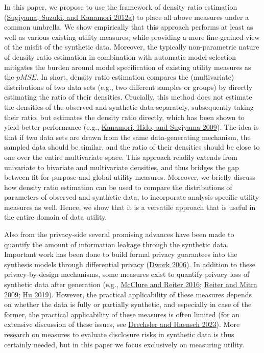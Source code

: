 \documentclass[
]{template/style/uneceart}
\begin{document}
In this paper, we propose to use the framework of density ratio
estimation
(\protect\hyperlink{ref-sugiyama_suzuki_kanamori_2012}{Sugiyama, Suzuki,
and Kanamori 2012a}) to place all above measures under a common
umbrella. We show empirically that this approach performs at least as
well as various existing utility measures, while providing a more
fine-grained view of the misfit of the synthetic data. Moreover, the
typically non-parametric nature of density ratio estimation in
combination with automatic model selection mitigates the burden around
model specification of existing utility measures as the \(pMSE\). In
short, density ratio estimation compares the (multivariate)
distributions of two data sets (e.g., two different samples or groups)
by directly estimating the ratio of their densities. Crucially, this
method does not estimate the densities of the observed and synthetic
data separately, subsequently taking their ratio, but estimates the
density ratio directly, which has been shown to yield better performance
(e.g., \protect\hyperlink{ref-kanamori_ulsif_2009}{Kanamori, Hido, and
Sugiyama 2009}). The idea is that if two data sets are drawn from the
same data-generating mechanism, the sampled data should be similar, and
the ratio of their densities should be close to one over the entire
multivariate space. This approach readily extends from univariate to
bivariate and multivariate densities, and thus bridges the gap between
fit-for-purpose and global utility measures. Moreover, we briefly
discuss how density ratio estimation can be used to compare the
distributions of parameters of observed and synthetic data, to
incorporate analysis-specific utility measures as well. Hence, we show
that it is a versatile approach that is useful in the entire domain of
data utility.

Also from the privacy-side several promising advances have been made to
quantify the amount of information leakage through the synthetic data.
Important work has been done to build formal privacy guarantees into the
synthesis models through differential privacy
(\protect\hyperlink{ref-dwork_dp_2006}{Dwork 2006}). In addition to
these privacy-by-design mechanisms, some measures exist to quantify
privacy loss of synthetic data after generation (e.g.,
\protect\hyperlink{ref-mcclure2016assessing}{McClure and Reiter 2016};
\protect\hyperlink{ref-Reiter_Mitra_2009}{Reiter and Mitra 2009};
\protect\hyperlink{ref-hu2019}{Hu 2019}). However, the practical
applicability of these measures depends on whether the data is fully or
partially synthetic, and especially in case of the former, the practical
applicability of these measures is often limited (for an extensive
discussion of these issues, see
\protect\hyperlink{ref-drechsler2023}{Drechsler and Haensch 2023}). More
research on measures to evaluate disclosure risks in synthetic data is
thus certainly needed, but in this paper we focus exclusively on
measuring utility.
\end{document}

